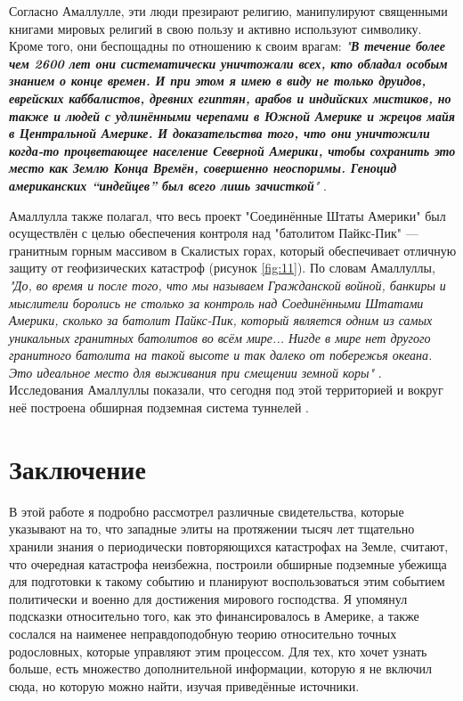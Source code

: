 \documentclass[10pt,twocolumn,letterpaper]{article}
\begin{document}
Согласно Амаллулле, эти люди презирают религию, манипулируют священными книгами мировых религий в свою пользу и активно используют символику. Кроме того, они беспощадны по отношению к своим врагам: \textit{"\textbf{В течение более чем 2600 лет они систематически уничтожали всех, кто обладал особым знанием о конце времен. И при этом я имею в виду не только друидов, еврейских каббалистов, древних египтян, арабов и индийских мистиков, но также и людей с удлинёнными черепами в Южной Америке и жрецов майя в Центральной Америке. И доказательства того, что они уничтожили когда-то процветающее население Северной Америки, чтобы сохранить это место как Землю Конца Времён, совершенно неоспоримы. Геноцид американских “индейцев” был всего лишь зачисткой}"} \cite{33,34}.

Амаллулла также полагал, что весь проект "Соединённые Штаты Америки" был осуществлён с целью обеспечения контроля над "батолитом Пайкс-Пик" — гранитным горным массивом в Скалистых горах, который обеспечивает отличную защиту от геофизических катастроф (рисунок \ref{fig:11}). По словам Амаллуллы, \textit{"До, во время и после того, что мы называем Гражданской войной, банкиры и мыслители боролись не столько за контроль над Соединёнными Штатами Америки, сколько за батолит Пайкс-Пик, который является одним из самых уникальных гранитных батолитов во всём мире... Нигде в мире нет другого гранитного батолита на такой высоте и так далеко от побережья океана. Это идеальное место для выживания при смещении земной коры"} \cite{33,34}. Исследования Амаллуллы показали, что сегодня под этой территорией и вокруг неё построена обширная подземная система туннелей \cite{36}.
\section{Заключение}

В этой работе я подробно рассмотрел различные свидетельства, которые указывают на то, что западные элиты на протяжении тысяч лет тщательно хранили знания о периодически повторяющихся катастрофах на Земле, считают, что очередная катастрофа неизбежна, построили обширные подземные убежища для подготовки к такому событию и планируют воспользоваться этим событием политически и военно для достижения мирового господства. Я упомянул подсказки относительно того, как это финансировалось в Америке, а также сослался на наименее неправдоподобную теорию относительно точных родословных, которые управляют этим процессом. Для тех, кто хочет узнать больше, есть множество дополнительной информации, которую я не включил сюда, но которую можно найти, изучая приведённые источники.
\end{document}
